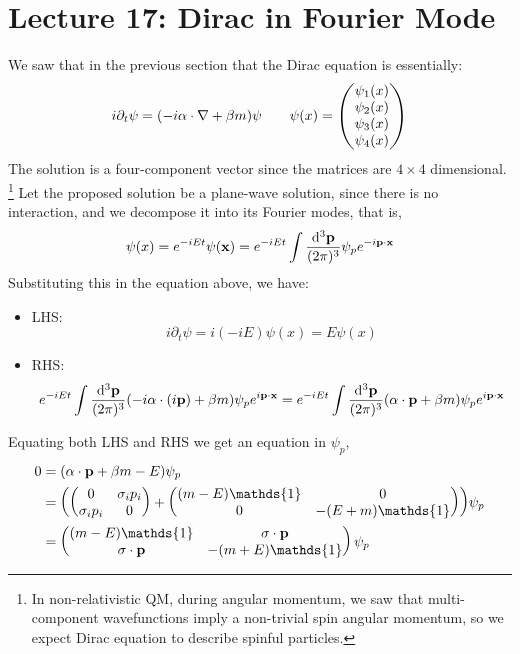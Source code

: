 \section*{Lecture 17: Dirac in Fourier Mode}\label{sec:lec17}
We saw that in the previous section that the Dirac equation is essentially:
$$i \partial_t \psi = \qty(-i \alpha \cdot \nabla + \beta m)\psi\qquad \psi(x) = \begin{pmatrix}
    \psi_1(x)\\ \psi_2(x) \\ \psi_3(x) \\ \psi_4(x)
\end{pmatrix}$$
The solution is a four-component vector since the matrices are $4\times 4$ dimensional. \footnote{In non-relativistic QM, during angular momentum, we saw that multi-component wavefunctions imply a non-trivial spin angular momentum, so we expect Dirac equation to describe spinful particles.}
Let the proposed solution be a plane-wave solution, since there is no interaction, and we decompose it into its Fourier modes, that is,
$$\psi(x) = e^{-iEt}\psi(\vb{x}) = e^{-iEt}\int \frac{\dd^3\vb{{\vb{p}}}}{(2\pi)^3}\psi_p e^{-i \vb{p}\cdot \vb{x}}$$
Substituting this in the equation above, we have:
\begin{itemize}
    \item LHS: $$i\partial_t\psi = i (-iE) \psi(x) = E\psi(x)$$
    \item RHS: $$e^{-iEt}\int \frac{\dd^3\vb{{\vb{p}}}}{(2\pi)^3} ( -i \alpha \cdot (i \vb{p}) + \beta m )\psi_pe^{i\vb{p}\cdot \vb{x}} =e^{-iEt}\int \frac{\dd^3\vb{{\vb{p}}}}{(2\pi)^3} (  \alpha \cdot  \vb{p} + \beta m )\psi_p e^{i\vb{p}\cdot \vb{x}} $$
\end{itemize}
Equating both LHS and RHS we get an equation in $\psi_p$, 
\begin{align*}
    0 &= \qty(\alpha\cdot \vb{p} + \beta m -E)\psi_p\\
    &=\qty(\begin{pmatrix}
        0&\sigma_i p_i\\
        \sigma_i p_i&0
    \end{pmatrix} + \begin{pmatrix}
        (m-E)\mathds{1}& 0\\
        0 &-(E+m)\mathds{1}
    \end{pmatrix})\psi_p\\
    &= \begin{pmatrix}
        (m-E)\mathds{1} & \sigma\cdot \vb{p} \\
        \sigma\cdot \vb{p} & -(m+E)\mathds{1}
    \end{pmatrix}\psi_p
\end{align*}
